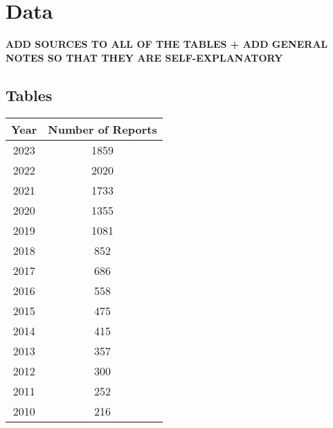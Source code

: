 \documentclass[12pt]{article}
\begin{document}
\pagebreak
\printbibliography{}
\pagebreak
\appendix

\section{Data}\label{app:data}

\textbf{ADD SOURCES TO ALL OF THE TABLES + ADD GENERAL NOTES SO THAT THEY ARE SELF-EXPLANATORY}

\subsection{Tables}\label{app:data:tabs}
\small
\centering

\begin{table}[h]
    \label{tab:sust_reps}
    \centering
        \begin{tabular}{cc}
            \toprule
            Year & Number of Reports\\
            \midrule
            2023 & 1859\\
            2022 & 2020\\
            2021 & 1733\\
            2020 & 1355\\
            2019 & 1081\\
            2018 & 852\\
            2017 & 686\\
            2016 & 558\\
            2015 & 475\\
            2014 & 415\\
            2013 & 357\\
            2012 & 300\\
            2011 & 252\\
            2010 & 216\\
            \bottomrule
        \end{tabular}
\end{table}

\pagebreak
\end{document}
